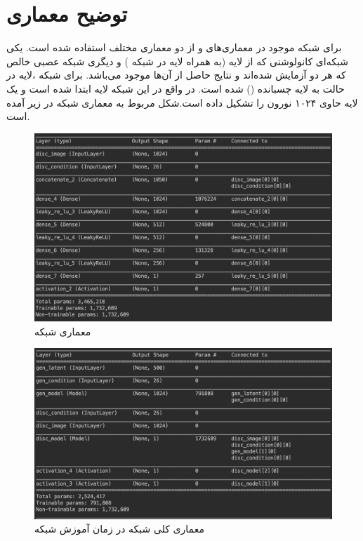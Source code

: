 \documentclass{article}
\begin{document}
\section{توضیح معماری }
برای شبکه  موجود در معماری‌های  و  از دو معماری مختلف استفاده‌ شده است. یکی شبکه‌ای کانولوشنی که از لایه  (به همراه لایه   در شبکه ) و دیگری شبکه عصبی  خالص که هر دو آزمایش شده‌اند و نتایج حاصل از آن‌ها موجود می‌باشد. برای شبکه ،‌لایه  در حالت  به لایه  چسبانده () شده است. در واقع در این شبکه لایه  ابتدا  شده است و یک لایه حاوی ۱۰۲۴ نورون را تشکیل داده است.شکل مربوط به معماری شبکه  در زیر آمده است.
\begin{figure}[H]
	\centerline{\includegraphics[width=\textwidth , height=\textheight ]{D}}
	\caption{معماری شبکه }
\end{figure}
\begin{figure}[H]
	\centerline{\includegraphics[width=\textwidth , height=\textheight ]{CGAN}}
	\caption{معماری کلی شبکه  در زمان آموزش شبکه }
\end{figure}
\end{document}
